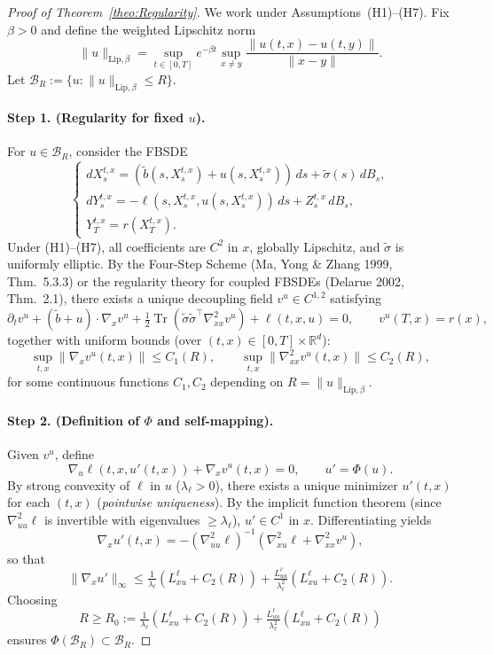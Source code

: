 \documentclass[10pt,a4paper]{amsart}
\def\w{\widetilde}
\begin{document}
\begin{proof}[Proof of Theorem~\ref{theo:Regularity}]
We work under Assumptions~(H1)--(H7).  
Fix $\beta>0$ and define the weighted Lipschitz norm
\[
\|u\|_{\mathrm{Lip},\beta}
=\sup_{t\in[0,T]}e^{-\beta t}\sup_{x\neq y}\frac{\|u(t,x)-u(t,y)\|}{\|x-y\|}.
\]
Let $\mathcal{B}_R:=\{u:\|u\|_{\mathrm{Lip},\beta}\le R\}$.

\paragraph{Step 1. (Regularity for fixed $u$).}
For $u\in\mathcal{B}_R$, consider the FBSDE
\[
\begin{cases}
dX_s^{t,x}=(\w b(s,X_s^{t,x})+u(s,X_s^{t,x}))\,ds+\w\sigma(s)\,dB_s,\\[3pt]
dY_s^{t,x}=-\ell(s,X_s^{t,x},u(s,X_s^{t,x}))\,ds+Z_s^{t,x}\,dB_s,\\[3pt]
Y_T^{t,x}=r(X_T^{t,x}).
\end{cases}
\]
Under (H1)--(H7), all coefficients are $C^2$ in $x$, globally Lipschitz, and $\w\sigma$ is uniformly elliptic.  
By the Four-Step Scheme \textnormal{(Ma, Yong \& Zhang 1999, Thm.~5.3.3)} or the regularity theory for coupled FBSDEs \textnormal{(Delarue 2002, Thm.~2.1)}, there exists a unique decoupling field $v^u\in C^{1,2}$ satisfying
\[
\partial_t v^u + (\w b+u)\cdot\nabla_x v^u
+ \tfrac{1}{2}\operatorname{Tr}(\w\sigma\w\sigma^\top\nabla_{xx}^2 v^u)
+ \ell(t,x,u)=0,\qquad v^u(T,x)=r(x),
\]
together with uniform bounds (over $(t,x)\in[0,T]\times\mathbb{R}^d$):
\[
\sup_{t,x}\|\nabla_x v^u(t,x)\|\le C_1(R),\qquad
\sup_{t,x}\|\nabla_{xx}^2 v^u(t,x)\|\le C_2(R),
\]
for some continuous functions $C_1,C_2$ depending on $R=\|u\|_{\mathrm{Lip},\beta}$.

\paragraph{Step 2. (Definition of $\Phi$ and self-mapping).}
Given $v^u$, define
\[
\nabla_u\ell(t,x,u'(t,x))+\nabla_x v^u(t,x)=0,\qquad
u'=\Phi(u).
\]
By strong convexity of $\ell$ in $u$ ($\lambda_\ell>0$), there exists a unique minimizer $u'(t,x)$ for each $(t,x)$ (\emph{pointwise uniqueness}).  
By the implicit function theorem (since $\nabla_{uu}^2\ell$ is invertible with eigenvalues $\ge\lambda_\ell$), $u'\in C^1$ in $x$.  
Differentiating yields
\[
\nabla_x u'(t,x)
=-(\nabla_{uu}^2\ell)^{-1}(\nabla_{xu}^2\ell+\nabla_{xx}^2 v^u),
\]
so that
\[
\|\nabla_x u'\|_\infty
\le\tfrac{1}{\lambda_\ell}(L_{xu}^\ell+C_2(R))
+\tfrac{L_{uu}^\ell}{\lambda_\ell^2}(L_{xu}^\ell+C_2(R)).
\]
Choosing 
\[
R \ge R_0 := 
\tfrac{1}{\lambda_\ell}(L_{xu}^\ell + C_2(R)) 
+ \tfrac{L_{uu}^\ell}{\lambda_\ell^2}(L_{xu}^\ell + C_2(R))
\]
ensures $\Phi(\mathcal{B}_R)\subset\mathcal{B}_R$.


\end{proof}
\end{document}
